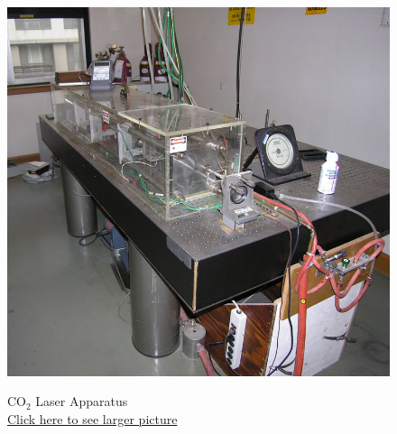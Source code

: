 \documentclass{../lab}
\begin{document}
\begin{figure}[H]
  \label{fig:HighVoltage}
\endminipage\hfill
{}
  \href{http://experimentationlab.berkeley.edu/sites/default/files/images/CO2_0687B.jpg}{\includegraphics[width=\linewidth,keepaspectratio]{images/CO2_0687B.jpg}}
  \caption{CO$_2$ Laser Apparatus \\
  \href{http://experimentationlab.berkeley.edu/sites/default/files/images/CO2_0687B.jpg}{Click here to see larger picture}}
  \label{fig:LaserApparatus}
\endminipage\hfill
{}

\end{figure}
\end{document}
